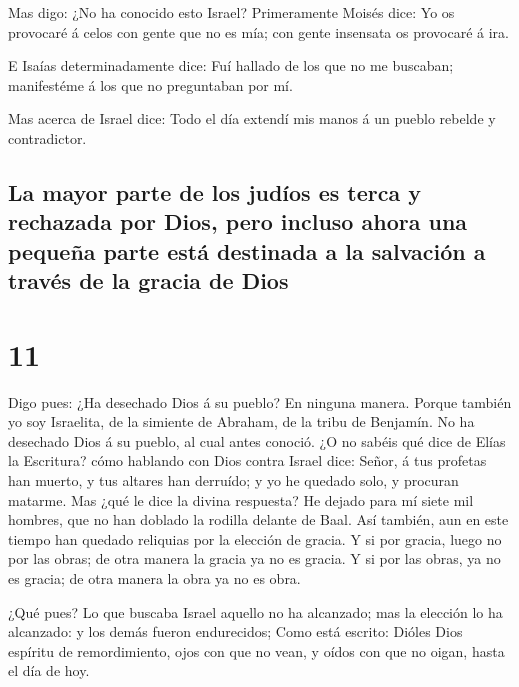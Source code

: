  Mas digo: ¿No ha conocido esto Israel? Primeramente
Moisés dice: Yo os provocaré á celos con gente que no es mía; con gente
insensata os provocaré á ira.

 E Isaías determinadamente dice: Fuí hallado de los que
no me buscaban; manifestéme á los que no preguntaban por mí.

 Mas acerca de Israel dice: Todo el día extendí mis manos
á un pueblo rebelde y contradictor.

\hypertarget{la-mayor-parte-de-los-juduxedos-es-terca-y-rechazada-por-dios-pero-incluso-ahora-una-pequeuxf1a-parte-estuxe1-destinada-a-la-salvaciuxf3n-a-travuxe9s-de-la-gracia-de-dios}{%
\subsection{La mayor parte de los judíos es terca y rechazada por Dios,
pero incluso ahora una pequeña parte está destinada a la salvación a
través de la gracia de
Dios}\label{la-mayor-parte-de-los-juduxedos-es-terca-y-rechazada-por-dios-pero-incluso-ahora-una-pequeuxf1a-parte-estuxe1-destinada-a-la-salvaciuxf3n-a-travuxe9s-de-la-gracia-de-dios}}

\hypertarget{section-45-11}{%
\section{11}\label{section-45-11}}

 Digo pues: ¿Ha desechado Dios á su pueblo? En ninguna
manera. Porque también yo soy Israelita, de la simiente de Abraham, de
la tribu de Benjamín.  No ha desechado Dios á su pueblo,
al cual antes conoció. ¿O no sabéis qué dice de Elías la Escritura? cómo
hablando con Dios contra Israel dice:  Señor, á tus
profetas han muerto, y tus altares han derruído; y yo he quedado solo, y
procuran matarme.  Mas ¿qué le dice la divina respuesta?
He dejado para mí siete mil hombres, que no han doblado la rodilla
delante de Baal.  Así también, aun en este tiempo han
quedado reliquias por la elección de gracia.  Y si por
gracia, luego no por las obras; de otra manera la gracia ya no es
gracia. Y si por las obras, ya no es gracia; de otra manera la obra ya
no es obra.

 ¿Qué pues? Lo que buscaba Israel aquello no ha alcanzado;
mas la elección lo ha alcanzado: y los demás fueron endurecidos;
 Como está escrito: Dióles Dios espíritu de remordimiento,
ojos con que no vean, y oídos con que no oigan, hasta el día de hoy.

